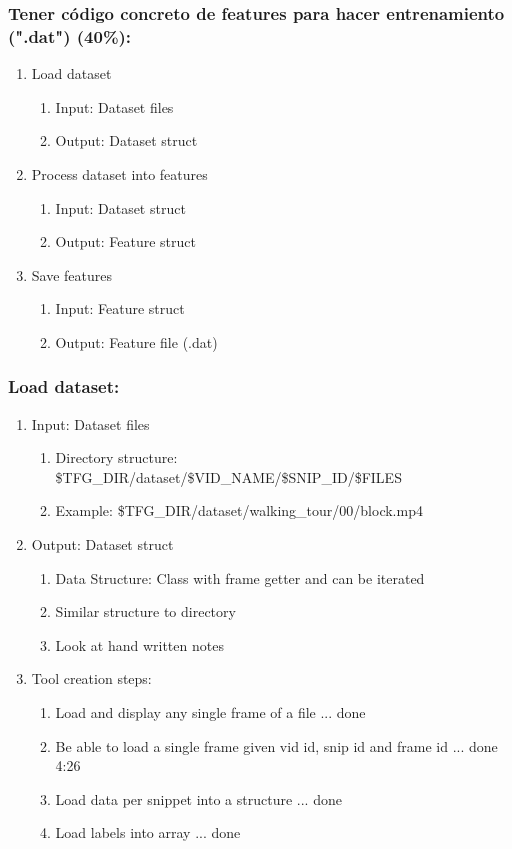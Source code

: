 \documentclass[12pt,oneside]{book}
\begin{document}
  \subsubsection*{Tener código concreto de features para hacer entrenamiento (".dat") (40\%):}
  \begin{enumerate}
    \item Load dataset
    \begin{enumerate}
      \item Input: Dataset files
      \item Output: Dataset struct
    \end{enumerate}
    \item Process dataset into features
    \begin{enumerate}
      \item Input: Dataset struct
      \item Output: Feature struct
    \end{enumerate}
    \item Save features
    \begin{enumerate}
      \item Input: Feature struct
      \item Output: Feature file (.dat)
    \end{enumerate}
  \end{enumerate}

  \subsubsection*{Load dataset:}
  \begin{enumerate}
    \item Input: Dataset files
    \begin{enumerate}
      \item Directory structure: \$TFG\_DIR/dataset/\$VID\_NAME/\$SNIP\_ID/\$FILES
      \item Example: \$TFG\_DIR/dataset/walking\_tour/00/block.mp4
    \end{enumerate}
    \item Output: Dataset struct
    \begin{enumerate}
      \item Data Structure: Class with frame getter and can be iterated
      \item Similar structure to directory
      \item Look at hand written notes
    \end{enumerate}
    \item Tool creation steps:
    \begin{enumerate}
      \item Load and display any single frame of a file ... done
      \item Be able to load a single frame given vid id, snip id and frame id ... done 4:26
      \item Load data per snippet into a structure ... done
      \item Load labels into array ... done
    \end{enumerate}
  \end{enumerate}
\end{document}

